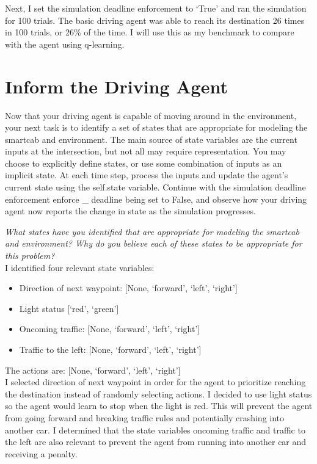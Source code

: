 \documentclass[11pt]{article}
\begin{document}
Next, I set the simulation deadline enforcement to ‘True’ and ran the simulation for 100 trials. The basic driving agent was able to reach its destination 26 times in 100 trials, or 26\% of the time. I will use this as my benchmark to compare with the agent using q-learning.

\section{Inform the Driving Agent}

Now that your driving agent is capable of moving around in the environment, your next task is to identify a set of states that are appropriate for modeling the smartcab and environment. The main source of state variables are the current inputs at the intersection, but not all may require representation. You may choose to explicitly define states, or use some combination of inputs as an implicit state. At each time step, process the inputs and update the agent's current state using the self.state variable. Continue with the simulation deadline enforcement enforce \_ deadline being set to False, and observe how your driving agent now reports the change in state as the simulation progresses.

\textit{What states have you identified that are appropriate for modeling the smartcab and environment? Why do you believe each of these states to be appropriate for this problem?}\\

I identified four relevant state variables:
\begin{itemize}
  \item Direction of next waypoint: [None, ‘forward’, ‘left’, ‘right’]
  \item Light status [‘red’, ‘green’]
  \item Oncoming traffic: [None, ‘forward’, ‘left’, ‘right’]
  \item Traffic to the left: [None, ‘forward’, ‘left’, ‘right’]
\end{itemize}

The actions are: [None, ‘forward’, ‘left’, ‘right’]\\

I selected direction of next waypoint in order for the agent to prioritize reaching the destination instead of randomly selecting actions. I decided to use light status so the agent would learn to stop when the light is red. This will prevent the agent from going forward and breaking traffic rules and potentially crashing into another car. I determined that the state variables oncoming traffic and traffic to the left are also relevant to prevent the agent from running into another car and receiving a penalty.
\end{document}
